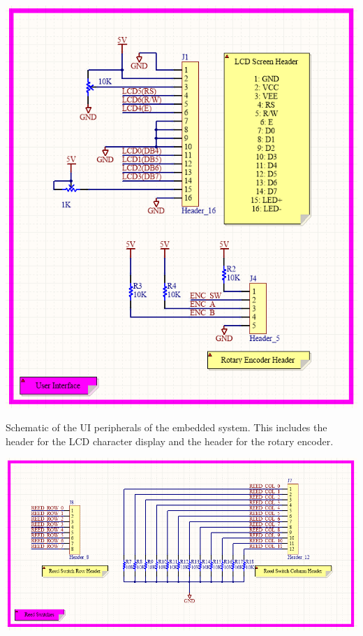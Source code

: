 \documentclass[12pt]{article}
\begin{document}
\vspace*{5mm}

\centerline{\includegraphics[scale=.75]{SchUI}}

\begin{center}
Schematic of the UI peripherals of the embedded system. This includes the header for the LCD character display and the header for the rotary encoder.
\end{center}

\vspace*{5mm}

\vspace*{5mm}

\centerline{\includegraphics[scale=.75]{SchReed}}
\end{document}
